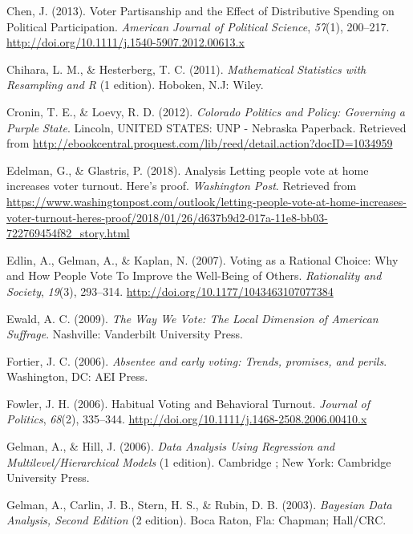 \documentclass[12pt,twoside]{reedthesis}
\begin{document}
  \hypertarget{ref-chen_voter_2013}{}
  Chen, J. (2013). Voter Partisanship and the Effect of Distributive
  Spending on Political Participation. \emph{American Journal of Political
  Science}, \emph{57}(1), 200--217.
  \url{http://doi.org/10.1111/j.1540-5907.2012.00613.x}
  
  \hypertarget{ref-chihara_mathematical_2011}{}
  Chihara, L. M., \& Hesterberg, T. C. (2011). \emph{Mathematical
  Statistics with Resampling and R} (1 edition). Hoboken, N.J: Wiley.
  
  \hypertarget{ref-cronin_colorado_2012}{}
  Cronin, T. E., \& Loevy, R. D. (2012). \emph{Colorado Politics and
  Policy: Governing a Purple State}. Lincoln, UNITED STATES: UNP -
  Nebraska Paperback. Retrieved from
  \url{http://ebookcentral.proquest.com/lib/reed/detail.action?docID=1034959}
  
  \hypertarget{ref-edelman_analysis_2018}{}
  Edelman, G., \& Glastris, P. (2018). Analysis Letting people vote at
  home increases voter turnout. Here's proof. \emph{Washington Post}.
  Retrieved from
  \url{https://www.washingtonpost.com/outlook/letting-people-vote-at-home-increases-voter-turnout-heres-proof/2018/01/26/d637b9d2-017a-11e8-bb03-722769454f82_story.html}
  
  \hypertarget{ref-edlin_voting_2007}{}
  Edlin, A., Gelman, A., \& Kaplan, N. (2007). Voting as a Rational
  Choice: Why and How People Vote To Improve the Well-Being of Others.
  \emph{Rationality and Society}, \emph{19}(3), 293--314.
  \url{http://doi.org/10.1177/1043463107077384}
  
  \hypertarget{ref-ewald_way_2009}{}
  Ewald, A. C. (2009). \emph{The Way We Vote: The Local Dimension of
  American Suffrage}. Nashville: Vanderbilt University Press.
  
  \hypertarget{ref-fortier_absentee_2006}{}
  Fortier, J. C. (2006). \emph{Absentee and early voting: Trends,
  promises, and perils}. Washington, DC: AEI Press.
  
  \hypertarget{ref-fowler_habitual_2006}{}
  Fowler, J. H. (2006). Habitual Voting and Behavioral Turnout.
  \emph{Journal of Politics}, \emph{68}(2), 335--344.
  \url{http://doi.org/10.1111/j.1468-2508.2006.00410.x}
  
  \hypertarget{ref-gelman_data_2006}{}
  Gelman, A., \& Hill, J. (2006). \emph{Data Analysis Using Regression and
  Multilevel/Hierarchical Models} (1 edition). Cambridge ; New York:
  Cambridge University Press.
  
  \hypertarget{ref-gelman_bayesian_2003}{}
  Gelman, A., Carlin, J. B., Stern, H. S., \& Rubin, D. B. (2003).
  \emph{Bayesian Data Analysis, Second Edition} (2 edition). Boca Raton,
  Fla: Chapman; Hall/CRC.
  
\end{document}
